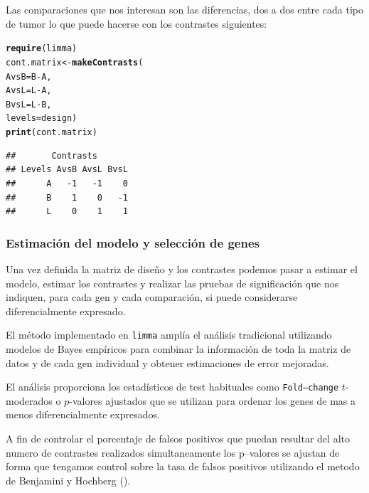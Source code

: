 \documentclass[a4paper]{article}\usepackage[]{graphicx}\usepackage[]{color}
\makeatletter
\newcommand{\hlopt}[1]{\textcolor[rgb]{0,0,0}{#1}}%
\newcommand{\hlstd}[1]{\textcolor[rgb]{0.345,0.345,0.345}{#1}}%
\newcommand{\hlkwb}[1]{\textcolor[rgb]{0.69,0.353,0.396}{#1}}%
\newcommand{\hlkwc}[1]{\textcolor[rgb]{0.333,0.667,0.333}{#1}}%
\newcommand{\hlkwd}[1]{\textcolor[rgb]{0.737,0.353,0.396}{\textbf{#1}}}%
\newenvironment{kframe}{%
 \def\at@end@of@kframe{}%
 \ifinner\ifhmode%
  \def\at@end@of@kframe{\end{minipage}}%
  \begin{minipage}{\columnwidth}%
 \fi\fi%
 \def\FrameCommand##1{\hskip\@totalleftmargin \hskip-\fboxsep
 \colorbox{shadecolor}{##1}\hskip-\fboxsep
     \hskip-\linewidth \hskip-\@totalleftmargin \hskip\columnwidth}%
 \MakeFramed {\advance\hsize-\width
   \@totalleftmargin\z@ \linewidth\hsize
   \@setminipage}}%
 {\par\unskip\endMakeFramed%
 \at@end@of@kframe}
\newenvironment{knitrout}{}{} %
\newcommand{\Rpackage}[1]{{\texttt{#1}}}
\makeatother
\begin{document}
Las comparaciones que nos interesan son las diferencias, dos a dos entre cada tipo de tumor lo que puede hacerse con los contrastes siguientes:

\begin{knitrout}
\color{fgcolor}\begin{kframe}
\begin{alltt}
\hlkwd{require}\hlstd{(limma)}
\hlstd{cont.matrix} \hlkwb{<-} \hlkwd{makeContrasts} \hlstd{(}
      \hlkwc{AvsB} \hlstd{= B}\hlopt{-}\hlstd{A,}
      \hlkwc{AvsL} \hlstd{= L}\hlopt{-}\hlstd{A,}
      \hlkwc{BvsL} \hlstd{= L}\hlopt{-}\hlstd{B,}
      \hlkwc{levels}\hlstd{=design)}
\hlkwd{print}\hlstd{(cont.matrix)}
\end{alltt}
\begin{verbatim}
##       Contrasts
## Levels AvsB AvsL BvsL
##      A   -1   -1    0
##      B    1    0   -1
##      L    0    1    1
\end{verbatim}
\end{kframe}
\end{knitrout}

\subsubsection{Estimación del modelo y selección de genes}

Una vez definida la matriz de diseño y los contrastes podemos pasar a estimar 
el modelo, estimar los contrastes y realizar las pruebas de significación 
que nos indiquen, para cada gen y cada comparaci\'on, 
si puede considerarse diferencialmente expresado.



El método implementado en \Rpackage {limma} amplía el análisis tradicional 
utilizando modelos de Bayes empíricos para combinar la información de toda la matriz de datos y de cada gen individual y  obtener estimaciones de error mejoradas.

El análisis proporciona los estadísticos de test habituales como \texttt{Fold--change}
$t$-moderados o $p$-valores ajustados que se utilizan para ordenar los genes de mas a menos diferencialmente expresados.

A fin de controlar el porcentaje de falsos positivos que puedan resultar del alto numero de contrastes realizados simultaneamente
los p--valores se ajustan de forma que tengamos control sobre la tasa de falsos positivos utilizando el metodo 
de Benjamini y Hochberg (\cite{BenjaminiHochberg:1995}). 
\end{document}

